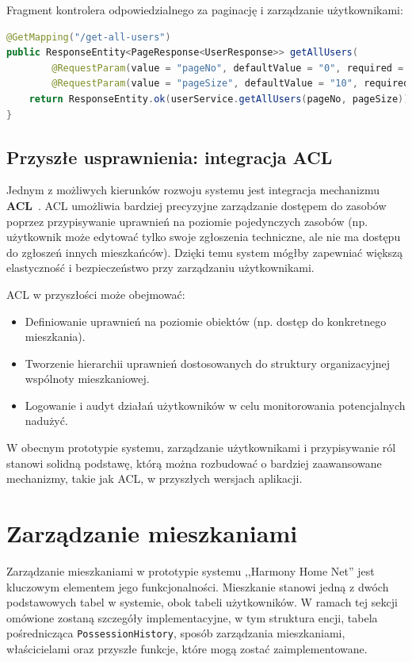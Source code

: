 Fragment kontrolera odpowiedzialnego za paginację i zarządzanie użytkownikami:
\begin{lstlisting}[language=Java, caption=Metoda paginacji w \texttt{UserController}]
@GetMapping("/get-all-users")
public ResponseEntity<PageResponse<UserResponse>> getAllUsers(
        @RequestParam(value = "pageNo", defaultValue = "0", required = false) int pageNo,
        @RequestParam(value = "pageSize", defaultValue = "10", required = false) int pageSize) {
    return ResponseEntity.ok(userService.getAllUsers(pageNo, pageSize));
}
\end{lstlisting}

\subsection{Przyszłe usprawnienia: integracja ACL}

Jednym z możliwych kierunków rozwoju systemu jest integracja mechanizmu \textbf{ACL}~\cite{acl}. ACL umożliwia bardziej precyzyjne zarządzanie dostępem do zasobów poprzez przypisywanie uprawnień na poziomie pojedynczych zasobów (np. użytkownik może edytować tylko swoje zgłoszenia techniczne, ale nie ma dostępu do zgłoszeń innych mieszkańców). Dzięki temu system mógłby zapewniać większą elastyczność i bezpieczeństwo przy zarządzaniu użytkownikami.

ACL w przyszłości może obejmować:
\begin{itemize}
    \item Definiowanie uprawnień na poziomie obiektów (np. dostęp do konkretnego mieszkania).
    \item Tworzenie hierarchii uprawnień dostosowanych do struktury organizacyjnej wspólnoty mieszkaniowej.
    \item Logowanie i audyt działań użytkowników w celu monitorowania potencjalnych nadużyć.
\end{itemize}

W obecnym prototypie systemu, zarządzanie użytkownikami i przypisywanie ról stanowi solidną podstawę, którą można rozbudować o bardziej zaawansowane mechanizmy, takie jak ACL, w przyszłych wersjach aplikacji.


\section{Zarządzanie mieszkaniami}

Zarządzanie mieszkaniami w prototypie systemu ,,Harmony Home Net'' jest kluczowym elementem jego funkcjonalności. Mieszkanie stanowi jedną z dwóch podstawowych tabel w systemie, obok tabeli użytkowników. W ramach tej sekcji omówione zostaną szczegóły implementacyjne, w tym struktura encji, tabela pośrednicząca \texttt{PossessionHistory}, sposób zarządzania mieszkaniami, właścicielami oraz przyszłe funkcje, które mogą zostać zaimplementowane.

